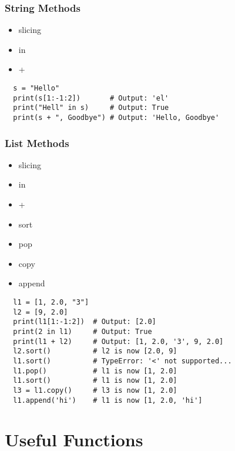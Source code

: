\documentclass[11pt]{article}
\begin{document}
\subsubsection{String Methods}
\vspace{-0.6cm}
\begin{multicols}{4}
  \begin{itemize}
      \item slicing
      \item in
      \item +
  \end{itemize}
\end{multicols}
\vspace{-0.4cm}
\begin{lstlisting}
  s = "Hello"
  print(s[1:-1:2])       # Output: 'el'
  print("Hell" in s)     # Output: True
  print(s + ", Goodbye") # Output: 'Hello, Goodbye'
\end{lstlisting}

\subsubsection{List Methods}
\vspace{-0.6cm}
\begin{multicols}{4}
  \begin{itemize}
      \item slicing
      \item in
      \item +
      \item sort
      \item pop
      \item copy
      \item append
  \end{itemize}
\end{multicols}
\vspace{-0.4cm}
\begin{lstlisting}
  l1 = [1, 2.0, "3"]
  l2 = [9, 2.0]
  print(l1[1:-1:2])  # Output: [2.0]
  print(2 in l1)     # Output: True
  print(l1 + l2)     # Output: [1, 2.0, '3', 9, 2.0]
  l2.sort()          # l2 is now [2.0, 9]
  l1.sort()          # TypeError: '<' not supported...
  l1.pop()           # l1 is now [1, 2.0]
  l1.sort()          # l1 is now [1, 2.0]
  l3 = l1.copy()     # l3 is now [1, 2.0]
  l1.append('hi')    # l1 is now [1, 2.0, 'hi']
\end{lstlisting}

\pagebreak

\section{Useful Functions}
\end{document}
